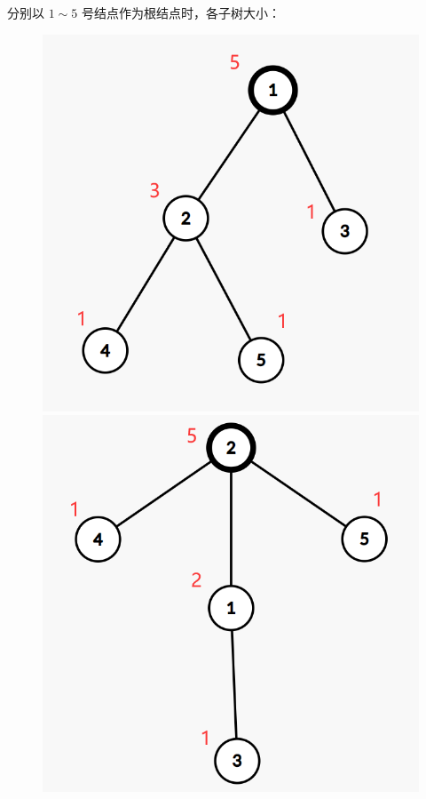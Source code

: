 \documentclass{ctpro}
\begin{document}
分别以 $1 \sim 5$ 号结点作为根结点时，各子树大小：
\begin{figure}
	\includegraphics[scale=0.14]{images/D_1.png}
	\includegraphics[scale=0.14]{images/D_2.png}

\end{figure}
\end{document}
